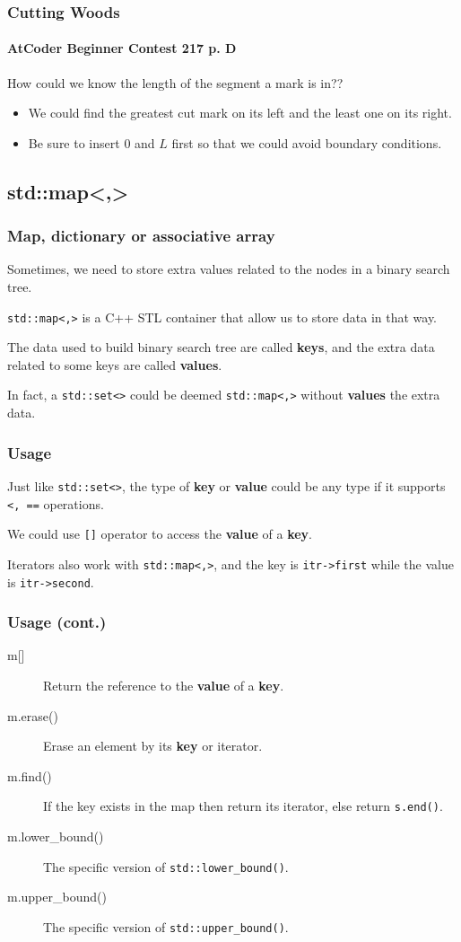 \documentclass{beamer}
\begin{document}
\frame
{
	\frametitle{Cutting Woods}
	\framesubtitle{AtCoder Beginner Contest 217 p. D}
	
	How could we know the length of the segment a mark is in??\pause
	
	\begin{itemize}
		\item We could find the greatest cut mark on its left and the least one on its right.\pause
		\item Be sure to insert $0$ and $L$ first so that we could avoid boundary  conditions.
	\end{itemize}
}

\subsection{std::map<,>}

\frame
{
	\frametitle{Map, dictionary or associative array}
	
	Sometimes, we need to store extra values related to the nodes in a binary search tree.
	
	\texttt{std::map<,>} is a C++ STL container that allow us to store data in that way.
	
	The data used to build binary search tree are called \textbf{keys}, and the extra data related to some keys are called \textbf{values}.
	
	In fact, a \texttt{std::set<>} could be deemed \texttt{std::map<,>} without \textbf{values} the extra data.
}

\frame
{
	\frametitle{Usage}
	
	Just like \texttt{std::set<>}, the type of \textbf{key} or \textbf{value} could be any type if it supports \texttt{<, ==} operations.
	
	We could use \texttt{[]} operator to access the \textbf{value} of a \textbf{key}.
	
	Iterators also work with \texttt{std::map<,>}, and the key is \texttt{itr->first} while the value is \texttt{itr->second}.
}

\frame
{
	\frametitle{Usage (cont.)}
	
	\begin{description}
		\item[\ttfamily m[{]}] Return the reference to the \textbf{value} of a \textbf{key}.
		\item[\ttfamily m.erase()] Erase an element by its \textbf{key} or iterator.
		\item[\ttfamily m.find()] If the key exists in the map then return its iterator, else return \texttt{s.end()}.
		\item[\ttfamily m.lower\_bound()] The specific version of \texttt{std::lower\_bound()}.
		\item[\ttfamily m.upper\_bound()] The specific version of \texttt{std::upper\_bound()}.
	\end{description}
}
\end{document}
